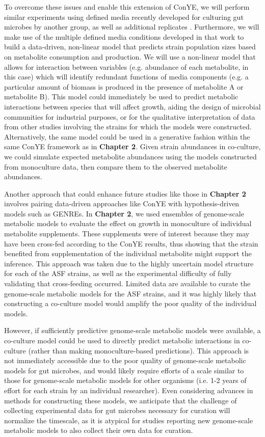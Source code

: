 \documentclass[11pt,onecolumn,notitlepage,openany,twoside]{book}
\begin{document}
\begin{refsection}
To overcome these issues and enable this extension of ConYE, we will perform similar experiments using defined media recently developed for culturing gut microbes by another group, as well as additional replicates \cite{Tramontano2018-xz}. Furthermore, we will make use of the multiple defined media conditions developed in that work to build a data-driven, non-linear model that predicts strain population sizes based on metabolite consumption and production. We will use a non-linear model that allows for interaction between variables (e.g. abundance of each metabolite, in this case) which will identify redundant functions of media components (e.g. a particular amount of biomass is produced in the presence of metabolite A or metabolite B). This model could immediately be used to predict metabolic interactions between species that will affect growth, aiding the design of microbial communities for industrial purposes, or for the qualitative interpretation of data from other studies involving the strains for which the models were constructed. Alternatively, the same model could be used in a generative fashion within the same ConYE framework as in \textbf{Chapter 2}. Given strain abundances in co-culture, we could simulate expected metabolite abundances using the models constructed from monoculture data, then compare them to the observed metabolite abundances.

Another approach that could enhance future studies like those in \textbf{Chapter 2} involves pairing data-driven approaches like ConYE with hypothesis-driven models such as GENREs. In \textbf{Chapter 2}, we used ensembles of genome-scale metabolic models to evaluate the effect on growth in monoculture of individual metabolite supplements. These supplements were of interest because they may have been cross-fed according to the ConYE results, thus showing that the strain benefited from supplementation of the individual metabolite might support the inference. This approach was taken due to the highly uncertain model structure for each of the ASF strains, as well as the experimental difficulty of fully validating that cross-feeding occurred. Limited data are available to curate the genome-scale metabolic models for the ASF strains, and it was highly likely that constructing a co-culture model would amplify the poor quality of the individual models.

However, if sufficiently predictive genome-scale metabolic models were available, a co-culture model could be used to directly predict metabolic interactions in co-culture (rather than making monoculture-based predictions). This approach is not immediately accessible due to the poor quality of genome-scale metabolic models for gut microbes, and would likely require efforts of a scale similar to those for genome-scale metabolic models for other organisms (i.e. 1-2 years of effort for each strain by an individual researcher). Even considering advances in methods for constructing these models, we anticipate that the challenge of collecting experimental data for gut microbes necessary for curation will normalize the timescale, as it is atypical for studies reporting new genome-scale metabolic models to also collect their own data for curation.


\end{refsection}
\end{document}
